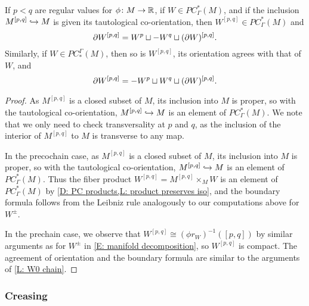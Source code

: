 \begin{lemma}\label{L: Wpq cochain}
	If $p < q$ are regular values for $\phi \colon M \to \mathbb{R}$, if $W \in PC^*_\Gamma(M)$, and if the inclusion $M^{[p,q]} \hookrightarrow M$ is given its tautological co-orientation, then
	$W^{[p,q]} \in PC^*_\Gamma(M)$ and
	$$\partial W^{[p,q]} = W^p \sqcup -W^q \sqcup (\partial W)^{[p,q]}.$$
	Similarly, if $W \in PC_*^\Gamma(M)$, then so is $W^{[p,q]}$, its orientation agrees with that of $W$, and
	$$\partial W^{[p,q]} = -W^p \sqcup W^q \sqcup (\partial W)^{[p,q]}.$$
\end{lemma}
\begin{proof}
	As $M^{[p,q]}$ is a closed subset of $M$, its inclusion into $M$ is proper, so with the tautological co-orientation, $M^{[p,q]} \hookrightarrow M$ is an element of $PC^*_\Gamma(M)$.
	We note that we only need to check transversality at $p$ and $q$, as the inclusion of the interior of $M^{[p,q]}$ to $M$ is transverse to any map.

	In the precochain case, as $M^{[p,q]}$ is a closed subset of $M$, its inclusion into $M$ is proper, so with the tautological co-orientation, $M^{[p,q]} \hookrightarrow M$ is an element of $PC^*_\Gamma(M)$.
	Thus the fiber product $W^{[p,q]} = M^{[p,q]} \times_M W$ is an element of $PC^*_\Gamma(M)$ by \cref{D: PC products,L: product preserves iso}, and the boundary formula follows from the Leibniz rule analogously to our computations above for $W^\pm$.

	In the prechain case, we observe that $W^{[p,q]} \cong (\phi r_W)^{-1}([p,q])$ by similar arguments as for $W^\pm$ in \cref{E: manifold decomposition}, so $W^{[p,q]}$ is compact.
	The agreement of orientation and the boundary formula are similar to the arguments of \cref{L: W0 chain}.
\end{proof}




\subsubsection{Creasing}\label{S: creasing}



